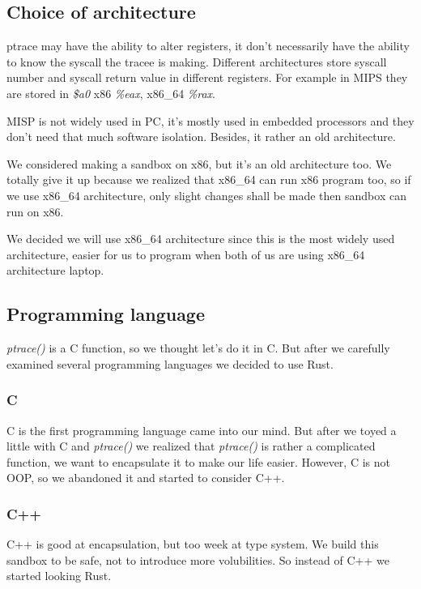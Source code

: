 \documentclass[conference,compsoc]{IEEEtran}
\begin{document}
	\subsection{Choice of architecture}

		\par
			ptrace may have the ability to alter registers, it don't necessarily have the ability to know the syscall the tracee is making. 
			Different architectures store syscall number and syscall return value in different registers. 
			For example in MIPS they are stored in \emph{\$a0} x86 \emph{\%eax}, x86\_64 \emph{\%rax}.
		\par
			MISP is not widely used in PC, it's mostly used in embedded processors and they don't need that much software isolation. 
			Besides, it rather an old architecture.
		\par 
			We considered making a sandbox on x86, but it's an old architecture too. 
			We totally give it up because we realized that x86\_64 can run x86 program too, so if we use x86\_64 architecture, only slight changes shall be made then sandbox can run on x86.
		\par 
			We decided we will use x86\_64 architecture since this is the most widely used architecture, easier for us to program when both of us are using x86\_64 architecture laptop.

	\subsection{Programming language}

		\par 
			\emph{ptrace()} is a C function, so we thought let's do it in C. 
			But after we carefully examined several programming languages we decided to use Rust.
		\subsubsection{C}
			\par
				C is the first programming language came into our mind. 
				But after we toyed a little with C and \emph{ptrace()} we realized that \emph{ptrace()} is rather a complicated function, we want to encapsulate it to make our life easier. 
				However, C is not OOP, so we abandoned it and started to consider C++.
		\subsubsection{C++}
			\par
				C++ is good at encapsulation, but too week at type system. 
				We build this sandbox to be safe, not to introduce more volubilities. 
				So instead of C++ we started looking Rust.
\end{document}
